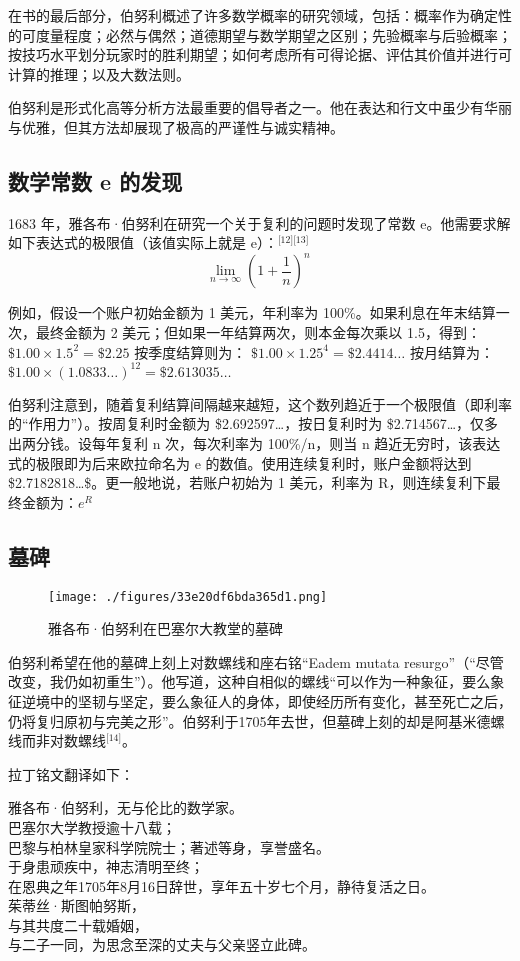 在书的最后部分，伯努利概述了许多数学概率的研究领域，包括：概率作为确定性的可度量程度；必然与偶然；道德期望与数学期望之区别；先验概率与后验概率；按技巧水平划分玩家时的胜利期望；如何考虑所有可得论据、评估其价值并进行可计算的推理；以及大数法则。

伯努利是形式化高等分析方法最重要的倡导者之一。他在表达和行文中虽少有华丽与优雅，但其方法却展现了极高的严谨性与诚实精神。
\subsection{数学常数 e 的发现}
1683 年，雅各布·伯努利在研究一个关于复利的问题时发现了常数 e。他需要求解如下表达式的极限值（该值实际上就是 e）：\(^\text{[12][13]}\)
$$
\lim_{n \to \infty} \left(1 + \frac{1}{n} \right)^n~
$$

例如，假设一个账户初始金额为 1 美元，年利率为 100\%。如果利息在年末结算一次，最终金额为 2 美元；但如果一年结算两次，则本金每次乘以 1.5，得到：
$\$1.00 \times 1.5^2 = \$2.25$
按季度结算则为：
$\$1.00 \times 1.25^4 = \$2.4414\ldots$
按月结算为：
$\$1.00 \times (1.0833\ldots)^{12} = \$2.613035\ldots$

伯努利注意到，随着复利结算间隔越来越短，这个数列趋近于一个极限值（即利率的“作用力”）。按周复利时金额为 \$2.692597…，按日复利时为 \$2.714567…，仅多出两分钱。设每年复利 n 次，每次利率为 100\%/n，则当 n 趋近无穷时，该表达式的极限即为后来欧拉命名为 e 的数值。使用连续复利时，账户金额将达到 \$2.7182818\ldots\$。更一般地说，若账户初始为 1 美元，利率为 R，则连续复利下最终金额为：$e^R$
\subsection{墓碑}
\begin{figure}[ht]
\centering
\texttt{[image: ./figures/33e20df6bda365d1.png]}
\caption{雅各布·伯努利在巴塞尔大教堂的墓碑} \label{fig_YGBbnl_4}
\end{figure}
伯努利希望在他的墓碑上刻上对数螺线和座右铭“Eadem mutata resurgo”（“尽管改变，我仍如初重生”）。他写道，这种自相似的螺线“可以作为一种象征，要么象征逆境中的坚韧与坚定，要么象征人的身体，即使经历所有变化，甚至死亡之后，仍将复归原初与完美之形”。伯努利于1705年去世，但墓碑上刻的却是阿基米德螺线而非对数螺线\(^\text{[14]}\)。

拉丁铭文翻译如下：

雅各布·伯努利，无与伦比的数学家。\\
巴塞尔大学教授逾十八载；\\
巴黎与柏林皇家科学院院士；著述等身，享誉盛名。\\
于身患顽疾中，神志清明至终；\\
在恩典之年1705年8月16日辞世，享年五十岁七个月，静待复活之日。\\
茱蒂丝·斯图帕努斯，\\
与其共度二十载婚姻，\\
与二子一同，为思念至深的丈夫与父亲竖立此碑。\\
